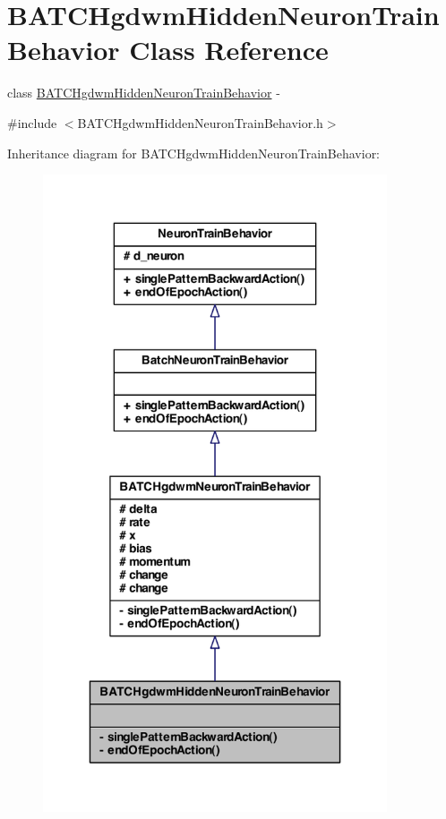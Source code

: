 \hypertarget{class_b_a_t_c_hgdwm_hidden_neuron_train_behavior}{
\section{BATCHgdwmHiddenNeuronTrainBehavior Class Reference}
\label{class_b_a_t_c_hgdwm_hidden_neuron_train_behavior}
}


class \hyperlink{class_b_a_t_c_hgdwm_hidden_neuron_train_behavior}{BATCHgdwmHiddenNeuronTrainBehavior} -\/  




{\ttfamily \#include $<$BATCHgdwmHiddenNeuronTrainBehavior.h$>$}



Inheritance diagram for BATCHgdwmHiddenNeuronTrainBehavior:
\nopagebreak
\begin{figure}[H]
\begin{center}
\leavevmode
\includegraphics[width=288pt]{class_b_a_t_c_hgdwm_hidden_neuron_train_behavior__inherit__graph}
\end{center}
\end{figure}


